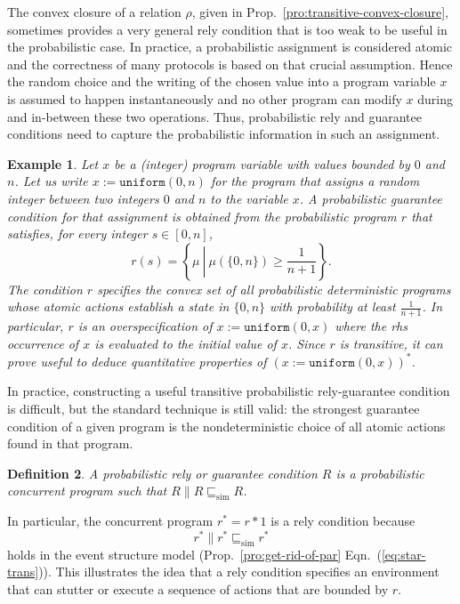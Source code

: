 \documentclass[review]{elsart}
\newtheorem{definition}{Definition}[section]
\newtheorem{example}[definition]{Example}
\newcommand{\bks}{*}
\newcommand{\refby}{\sqsubseteq}
\newcommand{\simref}{\refby_{\mathrm{sim}}}
\newcommand{\Eqn}[1]{Eqn.~(\ref{#1})}
\newcommand{\Prop}[1]{Prop.~\ref{#1}}
\begin{document}
The convex closure of a relation $\rho$, given in \Prop{pro:transitive-convex-closure}, sometimes provides a very general rely condition that is too weak to be useful in the probabilistic case. In practice, a probabilistic assignment is considered atomic and the correctness of many protocols is based on that crucial assumption. Hence the random choice and the writing of the chosen value into a program variable $x$ is assumed to happen instantaneously and no other program can modify $x$ during and in-between these two operations. Thus, probabilistic rely and guarantee conditions need to capture the probabilistic information in such an assignment.

\begin{example} Let $x$ be a (integer) program variable with values bounded by $0$ and $n$. Let us write $x{:=}\mathtt{uniform}(0,n)$ for the program that assigns a random integer between two integers $0$ and $n$ to the variable $x$. A probabilistic guarantee condition for that assignment is obtained from the probabilistic program $r$ that satisfies, for every integer $s\in[0,n]$,
 \begin{equation}\label{eq:example-rely} 
r(s) = \left\lbrace\mu\ \left| \ \mu(\{0,n\}) \geq\frac{1}{n{+}1}\right.\right\rbrace.  \end{equation} 
The condition $r$ specifies the convex set of all probabilistic deterministic programs whose atomic actions establish a state in $\{0,n\}$ with probability at least $\frac{1}{n{+}1}$. In particular, $r$ is an overspecification of  $x{:=}\mathtt{uniform}(0,x)$ where the rhs occurrence of $x$ is evaluated to the initial value of $x$. Since $r$ is transitive, it can prove useful to deduce quantitative properties of $(x{:=}\mathtt{uniform}(0,x))^{\bks}$.  \end{example}

In practice, constructing a useful transitive probabilistic rely-guarantee condition is difficult, but the standard technique is still valid: the strongest guarantee condition of a given program is the nondeterministic choice of all atomic actions found in that program.
\begin{definition}\label{def:rely}
A \emph{probabilistic rely} or \emph{guarantee condition} $R$ is a probabilistic concurrent program such that $R\|R \simref R$.
\end{definition} 

In particular, the concurrent program $r^{\bks} = r{\bks}1$ is a rely condition because 
\begin{equation}\label{eq:rely-closure}
r^{\bks}\|r^{\bks}\simref r^{\bks}
\end{equation}
holds in the event structure model (\Prop{pro:get-rid-of-par} \Eqn{eq:star-trans}). This illustrates the idea that a rely condition specifies an environment that can stutter or execute a sequence of actions that are bounded by $r$. 
\end{document}
